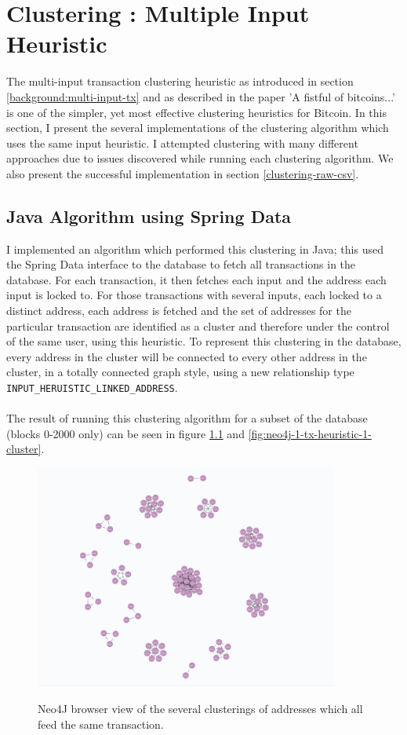 \chapter{Clustering : Multiple Input Heuristic}\label{section-clustering}

The multi-input transaction clustering heuristic as introduced in section \ref{background:multi-input-tx} and as described in the paper 'A fistful of bitcoins...' \cite{RefWorks:doc:5c3de7e3e4b0ea6196452d80} is one of the simpler, yet most effective clustering heuristics for Bitcoin. In this section, I present the several implementations of the clustering algorithm which uses the same input heuristic. I attempted clustering with many different approaches due to issues discovered while running each clustering algorithm. We also present the successful implementation in section \ref{clustering-raw-csv}.

\section{Java Algorithm using Spring Data}
I implemented an algorithm which performed this clustering in Java; this used the Spring Data interface to the database to fetch all transactions in the database. For each transaction, it then fetches each input and the address each input is locked to. For those transactions with several inputs, each locked to a distinct address, each address is fetched and the set of addresses for the particular transaction are identified as a cluster and therefore under the control of the same user, using this heuristic. To represent this clustering in the database, every address in the cluster will be connected to every other address in the cluster, in a totally connected graph style, using a new relationship type \texttt{INPUT\_HERUISTIC\_LINKED\_ADDRESS}. 
\\\\
The result of running this clustering algorithm for a subset of the database (blocks 0-2000 only) can be seen in figure \ref{fig:neo4j-many-heuristic-1-clusters} and \ref{fig:neo4j-1-tx-heuristic-1-cluster}. 

\begin{figure}[h!]
  \centering
  \includegraphics[width = 10cm]{./figures/many-clusters-heuristic-1}\\[0.5cm] 
  \caption{Neo4J browser view of the several clusterings of addresses which all feed the same transaction.}
  \label{fig:neo4j-many-heuristic-1-clusters}
\end{figure}

